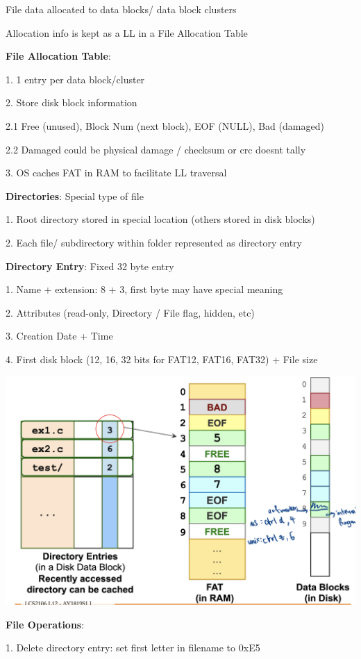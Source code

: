 \documentclass[10pt, a4paper]{article}
\newcommand{\blue}[1]{{\color{MidnightBlue}#1}}
\newcommand{\red}[1]{{\color{red}#1}}
\newcommand{\tab}[0]{\hspace*{2mm}}
\begin{document}
\begin{multicols*}{3}
		File data allocated to data blocks/ data block clusters

		Allocation info is kept as a LL in a \blue{File Allocation Table}

		\textbf{File Allocation Table}:

		1. 1 entry per data block/cluster

		2. Store disk block information 

		\tab{} 2.1 \blue{Free} (unused), \blue{Block Num} (next block), \blue{EOF} (NULL), \blue{Bad} (damaged)

		\tab{} 2.2 Damaged could be physical damage / checksum or crc doesnt tally

		3. OS caches FAT in RAM to facilitate LL traversal

		\textbf{Directories}: Special type of file

		1. Root directory stored in special location (others stored in disk blocks)

		2. Each file/ subdirectory within folder represented as \blue{directory entry}

		\textbf{Directory Entry}: Fixed 32 byte entry 

		1. Name + extension: 8 + 3, first byte may have special meaning

		2. Attributes (read-only, Directory / File flag, hidden, etc)

		3. Creation Date + Time

		4. First disk block (12, 16, 32 bits for FAT12, FAT16, FAT32) + File size

		\includegraphics*[scale=0.2]{./assets/FatFS}

		\textbf{File Operations}:

		1. Delete directory entry: set first letter in filename to \red{0xE5}


\end{multicols*}
\end{document}
